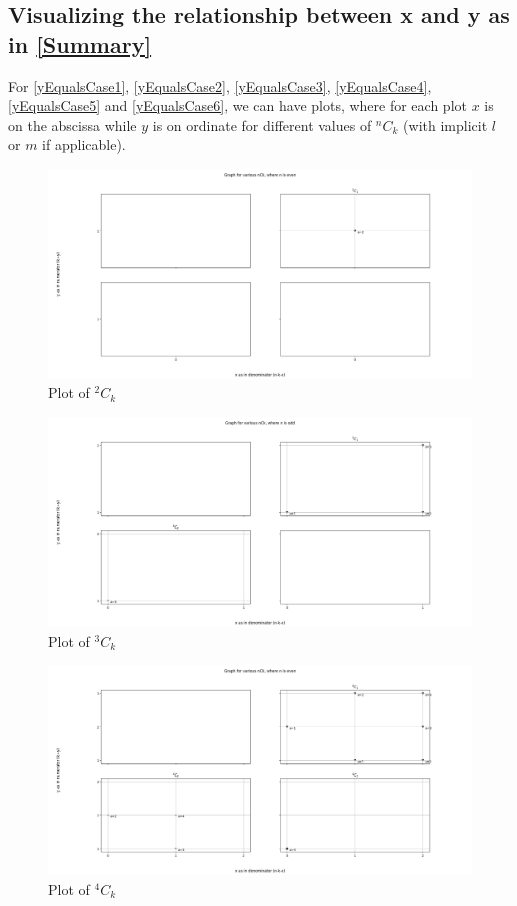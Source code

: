 \documentclass[12pt, twoside]{article}
\newcommand*{\Combination}[2]{{}^{#1}C_{#2}}%
\begin{document}
\subsection{Visualizing the relationship between x and y as in \ref{Summary}}
For \eqref{yEqualsCase1}, \eqref{yEqualsCase2}, \eqref{yEqualsCase3}, \eqref{yEqualsCase4}, \eqref{yEqualsCase5} and \eqref{yEqualsCase6}, we can have plots, where for each plot $x$ is on the abscissa while $y$ is on ordinate for different values of $\Combination{n}{k}$ (with implicit $l$ or $m$ if applicable).
\begin{figure}[ph!]
	\includegraphics[width=\linewidth]{2Ck.png}
	\caption{Plot of $\Combination{2}{k}$}
	\label{2Ck}
\end{figure}
\begin{figure}[ph!]	
	\includegraphics[width=\linewidth]{3Ck.png}
	\caption{Plot of $\Combination{3}{k}$}
	\label{3Ck}
\end{figure}
\begin{figure}[ph!]	
	\includegraphics[width=\linewidth]{4Ck.png}
	\caption{Plot of $\Combination{4}{k}$}
	\label{4Ck}
\end{figure}
\end{document}
